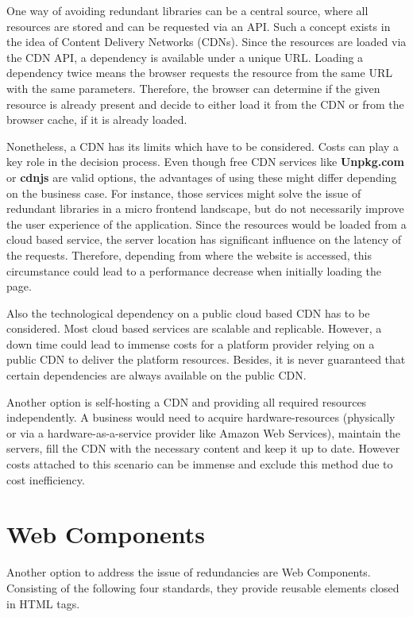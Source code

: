 One way of avoiding redundant libraries can be a central source, where all resources are stored and can be requested via an API. Such a concept exists in the idea of Content Delivery Networks (CDNs).
Since the resources are loaded via the CDN API, a dependency is available under a unique URL. Loading a dependency twice means the browser requests the resource from the same URL with the same parameters. Therefore, the browser can determine if the given resource is already present and decide to either load it from the CDN or from the browser cache, if it is already loaded.\cite{caching_in_browser}

Nonetheless, a CDN has its limits which have to be considered. Costs can play a key role in the decision process.
Even though free CDN services like \textbf{Unpkg.com} or \textbf{cdnjs} are valid options, the advantages of using these might differ depending on the business case.
For instance, those services might solve the issue of redundant libraries in a micro frontend landscape, but do not necessarily improve the user experience of the application. 
Since the resources would be loaded from a cloud based service, the server location has significant influence on the latency of the requests. Therefore, depending from where the website is accessed, this circumstance could lead to a performance decrease when initially loading the page.\cite{cdn_general}

Also the technological dependency on a public cloud based CDN has to be considered. Most cloud based services are scalable and replicable. However, a down time could lead to immense costs for a platform provider relying on a public CDN to deliver the platform resources.
Besides, it is never guaranteed that certain dependencies are always available on the public CDN.

Another option is self-hosting a CDN and providing all required resources independently. A business would need to acquire hardware-resources (physically or via a hardware-as-a-service provider like Amazon Web Services), maintain the servers, fill the CDN with the necessary content and keep it up to date. However costs attached to this scenario can be immense and exclude this method due to cost inefficiency.\cite{Meassuring_a_commercial_CDN}

\section{Web Components}

Another option to address the issue of redundancies are Web Components. Consisting of the following four standards, they provide reusable elements closed in HTML tags.\cite{mdn_web_docs}

